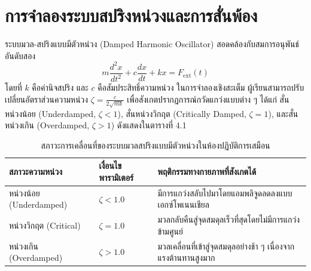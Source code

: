 \section{การจำลองระบบสปริงหน่วงและการสั่นพ้อง}

ระบบมวล-สปริงแบบมีตัวหน่วง (Damped Harmonic Oscillator) สอดคล้องกับสมการอนุพันธ์อันดับสอง
\begin{equation}
m\frac{d^2 x}{dt^2} + c\frac{dx}{dt} + kx = F_{\text{ext}}(t)
\end{equation}
โดยที่ $k$ คือค่านิจสปริง และ $c$ คือสัมประสิทธิ์ความหน่วง ในการจำลองเชิงสะเต็ม ผู้เรียนสามารถปรับเปลี่ยนอัตราส่วนความหน่วง $\zeta = \frac{c}{2\sqrt{mk}}$ เพื่อสังเกตปรากฏการณ์กวัดแกว่งแบบต่าง ๆ ได้แก่ สั่นหน่วงน้อย (Underdamped, $\zeta < 1$), สั่นหน่วงวิกฤต (Critically Damped, $\zeta = 1$), และสั่นหน่วงเกิน (Overdamped, $\zeta > 1$) ดังแสดงในตารางที่ 4.1

\begin{table}[htbp]
\centering
\caption{สภาวะการเคลื่อนที่ของระบบมวลสปริงแบบมีตัวหน่วงในห้องปฏิบัติการเสมือน}
\label{tab:damping_states}
\begin{tabularx}{\textwidth}{lYY}
\toprule
\textbf{สภาวะความหน่วง} & \textbf{เงื่อนไขพารามิเตอร์} & \textbf{พฤติกรรมทางกายภาพที่สังเกตได้} \\
\midrule
หน่วงน้อย (Underdamped) & $\zeta < 1.0$ & มีการแกว่งสลับไปมาโดยแอมพลิจูดลดลงแบบเอกซ์โพเนนเชียล \\
หน่วงวิกฤต (Critical) & $\zeta = 1.0$ & มวลกลับคืนสู่จุดสมดุลเร็วที่สุดโดยไม่มีการแกว่งข้ามศูนย์ \\
หน่วงเกิน (Overdamped) & $\zeta > 1.0$ & มวลเคลื่อนที่เข้าสู่จุดสมดุลอย่างช้า ๆ เนื่องจากแรงต้านทานสูงมาก \\
\bottomrule
\end{tabularx}
\end{table}

